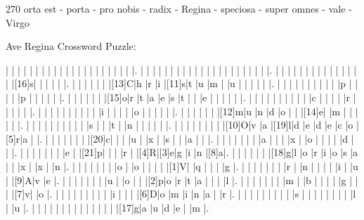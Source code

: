 \documentclass[12pt]{article}
\begin{document}
\pagestyle{fancy}
\fancyhf{}
\renewcommand{\headrulewidth}{0pt}
\renewcommand{\footrulewidth}{0pt}
\libertine
\renewcommand\PuzzleClueFont{\rm\normalsize}
\noindent\begin{rotate}{0}
\small
\end{rotate}
\hfill
\begin{rotate}{270}
\small
\qquad orta est - porta - pro nobis - radix - Regina - speciosa - super omnes - vale - Virgo
\end{rotate}
\begin{center}
  \huge{Ave Regina Crossword Puzzle:}
\end{center}
\vspace{1.5cm}
\begin{Puzzle}{22}{24}
  |{}  |{}  |{}  |{}  |{}  |{}  |{}  |{}  |{}  |{}  |{}  |{}  |{}  |{}  |{}  |{}  |{}  |{}  |{}  |{}  |{}  |.
  |{}  |{}  |{}  |{}  |{}  |{}  |{}  |{}  |{}  |{}  |{}  |{}  |{}  |{}  |{}  |{}  |{}  |{}  |{}  |{}  |{}  |.
  |{}  |{}  |{}  |{}  |{}  |{}  |{}  |{}  |{}  |{}  |{}  |{}  |{}  |{}  |{}  |[16]s|{}  |{}  |{}  |{}  |{}  |.
  |{}  |{}  |{}  |{}  |{}  |{}  |[13]C|h   |r   |i   |[11]s|t   |u   |m   |{}  |u   |{}  |{}  |{}  |{}  |{}  |.
  |{}  |{}  |{}  |{}  |{}  |{}  |{}  |{}  |{}  |{}  |p   |{}  |{}  |{}  |{}  |p   |{}  |{}  |{}  |{}  |{}  |.
  |{}  |{}  |{}  |{}  |{}  |{}  |[15]o|r   |t   |a   |e   |s   |t   |{}  |{}  |e   |{}  |{}  |{}  |{}  |{}  |.
  |{}  |{}  |{}  |{}  |{}  |{}  |{}  |{}  |{}  |{}  |c   |{}  |{}  |{}  |{}  |r   |{}  |{}  |{}  |{}  |{}  |.
  |{}  |{}  |{}  |{}  |{}  |{}  |{}  |{}  |{}  |{}  |i   |{}  |{}  |{}  |{}  |o   |{}  |{}  |{}  |{}  |{}  |.
  |{}  |{}  |{}  |{}  |{}  |{}  |[12]m|u   |n   |d   |o   |{}  |{}  |[14]e|{}  |m   |{}  |{}  |{}  |{}  |{}  |.
  |{}  |{}  |{}  |{}  |{}  |{}  |{}  |{}  |{}  |{}  |s   |{}  |{}  |t   |{}  |n   |{}  |{}  |{}  |{}  |{}  |.
  |{}  |{}  |{}  |{}  |{}  |{}  |{}  |{}  |[10]O|v   |a   |[19]l|d   |e   |d   |e   |c   |o   |[5]r|a   |{}  |.
  |{}  |{}  |{}  |{}  |{}  |{}  |{}  |[20]c|{}  |{}  |{}  |u   |{}  |x   |{}  |s   |{}  |{}  |a   |{}  |{}  |.
  |{}  |{}  |{}  |{}  |{}  |{}  |{}  |a   |{}  |{}  |{}  |x   |{}  |o   |{}  |{}  |{}  |{}  |d   |{}  |{}  |.
  |{}  |{}  |{}  |{}  |{}  |{}  |{}  |e   |{}  |[21]p|{}  |{}  |{}  |r   |{}  |[4]R|[3]e|g   |i   |n   |[8]a|.
  |{}  |{}  |{}  |{}  |{}  |{}  |[18]g|l   |o   |r   |i   |o   |s   |a   |{}  |{}  |x   |{}  |x   |{}  |n   |.
  |{}  |{}  |{}  |{}  |{}  |{}  |{}  |o   |{}  |o   |{}  |{}  |{}  |{}  |[1]V|{}  |q   |{}  |{}  |{}  |g   |.
  |{}  |{}  |{}  |{}  |{}  |{}  |{}  |r   |{}  |n   |{}  |{}  |{}  |{}  |i   |{}  |u   |{}  |[9]A|v   |e   |.
  |{}  |{}  |{}  |{}  |{}  |{}  |{}  |u   |{}  |o   |{}  |{}  |[2]p|o   |r   |t   |a   |{}  |{}  |{}  |l   |.
  |{}  |{}  |{}  |{}  |{}  |{}  |{}  |m   |{}  |b   |{}  |{}  |{}  |{}  |g   |{}  |{}  |{}  |[7]v|{}  |o   |.
  |{}  |{}  |{}  |{}  |{}  |{}  |{}  |{}  |{}  |i   |{}  |{}  |{}  |[6]D|o   |m   |i   |n   |a   |{}  |r   |.
  |{}  |{}  |{}  |{}  |{}  |{}  |{}  |{}  |{}  |s   |{}  |{}  |{}  |{}  |{}  |{}  |{}  |{}  |l   |{}  |u   |.
  |{}  |{}  |{}  |{}  |{}  |{}  |{}  |{}  |{}  |{}  |{}  |{}  |{}  |{}  |[17]g|a   |u   |d   |e   |{}  |m   |.
\end{Puzzle}
\end{document}
